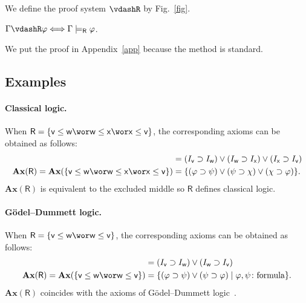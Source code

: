\documentclass[doctor]{iscs-thesis}
\begin{document}
\begin{definition}
 We define the proof system $\vdashR$ by Fig.~\ref{fig}.
\end{definition}

\begin{theorem}
 \label{sound-comp-nat-kripke}
 $\Gamma\vdashR\varphi\Longleftrightarrow\Gamma\modelsR \varphi$\enspace.
\end{theorem}
We put the proof in Appendix~\ref{app} because the method is
standard.

\subsection{Examples}

\paragraph{Classical logic.}
When
$\mathsf R = \{\mathsf v\le\mathsf w\wor\mathsf w\le\mathsf x\wor\mathsf x\le\mathsf
v\}$,
the corresponding axioms can be obtained as follows:
\begin{align*}
[ \mathsf v\le \mathsf w\wor \mathsf w\le\mathsf x\wor \mathsf x\le\mathsf v ] &=
(I_{\mathsf v}\supset I_{\mathsf w})\vee (I_{\mathsf w}\supset
I_{\mathsf x})\vee (I_{\mathsf x}\supset I_{\mathsf v})
\\
\mathbf{Ax}(\mathsf R) = \mathbf{Ax}(\{\mathsf v\le\mathsf w\wor \mathsf
w\le \mathsf x \wor \mathsf x\le\mathsf v\}) &= \{(\varphi\supset\psi)\vee(\psi\supset\chi)\vee(\chi\supset\varphi)\}.
\end{align*}
$\mathbf{Ax}(\mathsf R)$ is equivalent to the excluded middle so $\mathsf R$ defines
classical logic.

\paragraph{G\"{o}del--Dummett logic.}
When $\mathsf R=\{\mathsf v\le\mathsf w\wor\mathsf w\le\mathsf v\}$,
the corresponding axioms can be obtained as follows:
\begin{align*}
[\mathsf v\le \mathsf w\wor \mathsf w\le\mathsf v] &=
(I_{\mathsf v}\supset I_{\mathsf w})\vee (I_{\mathsf w}\supset
I_{\mathsf v})\\
\mathbf{Ax}(\mathsf R) = \mathbf{Ax}(\{\mathsf v\le\mathsf w\wor \mathsf
w\le \mathsf v\}) &= \{(\varphi\supset\psi)\vee(\psi\supset\varphi)\mid
\varphi,\psi\colon\mbox{formula}\}.
\end{align*}
$\mathbf{Ax}(\mathsf R)$ coincides with the axioms of
G\"{o}del--Dummett logic~\cite{dummett59}.
\end{document}
